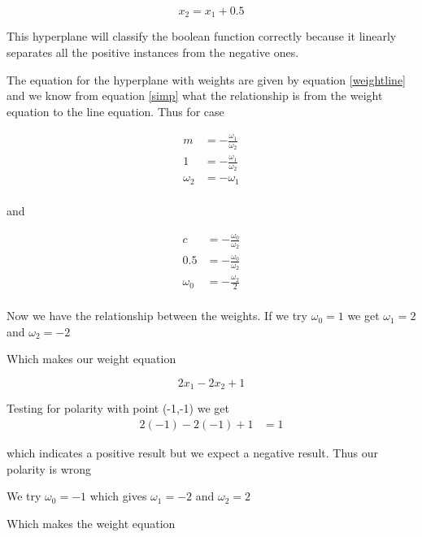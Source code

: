 \documentclass[10pt,a4paper]{article}
\begin{document}
\begin{equation}
x_2 = x_1 + 0.5
\end{equation}

This hyperplane will classify the boolean function correctly because it linearly separates all the positive instances from the negative ones.

The equation for the hyperplane with weights are given by equation \ref{weightline} and we know from equation \ref{simp} what the relationship is from the weight equation to the line equation. Thus for case

\begin{equation}
\begin{split}
m &= -\frac{\omega_1}{\omega_2} \\
1 &= -\frac{\omega_1}{\omega_2} \\
\omega_2 &= -\omega_1 \\
\end{split}
\end{equation}

and

\begin{equation}
\begin{split}
c &= -\frac{\omega_0}{\omega_2}\\
0.5 &= -\frac{\omega_0}{\omega_2}\\
\omega_0 &= -\frac{\omega_2}{2}\\
\end{split}
\end{equation}

Now we have the relationship between the weights. If we try $\omega_0 = 1$ we get $\omega_1 = 2$ and $\omega_2 = -2$ 

Which makes our weight equation

\begin{equation}
2x_1 - 2x_2 + 1
\end{equation}

Testing for polarity with point (-1,-1) we get
\begin{equation}
\begin{split}
2(-1) -2(-1) + 1 &= 1
\end{split}
\end{equation}

which indicates a positive result but we expect a negative result. Thus our polarity is wrong

We try $\omega_0 = -1$ which gives $\omega_1 = -2$ and $\omega_2 = 2$

Which makes the weight equation
\end{document}
